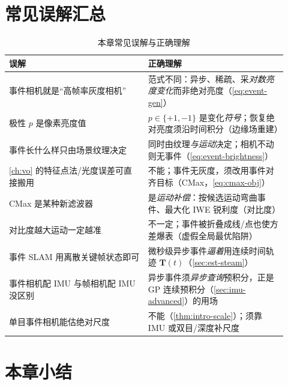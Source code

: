 \section*{常见误解汇总}

\begin{table}[H]\centering\small
\caption{本章常见误解与正确理解}
\begin{tabular}{p{0.46\linewidth}p{0.46\linewidth}}
\toprule
误解 & 正确理解 \\
\midrule
事件相机就是“高帧率灰度相机” & 范式不同：异步、稀疏、采\emph{对数亮度变化}而非绝对亮度（\cref{eq:event-gen}）\\
极性 $p$ 是像素亮度值 & $p\in\{+1,-1\}$ 是变化\emph{符号}；恢复绝对亮度须沿时间积分（边缘场重建）\\
事件长什么样只由场景纹理决定 & 同时由纹理\emph{与运动}决定；相机不动则无事件（\cref{eq:event-brightness}）\\
\cref{ch:vo} 的特征点法/光度误差可直接搬用 & 不能；事件无灰度，须改用事件对齐目标（CMax，\cref{eq:cmax-obj}）\\
CMax 是某种新滤波器 & 是\emph{运动补偿}：按候选运动弯曲事件、最大化 IWE 锐利度（对比度）\\
对比度越大运动一定越准 & 不一定；事件被折叠成线/点也使方差爆表（虚假全局最优陷阱）\\
事件 SLAM 用离散关键帧状态即可 & 微秒级异步事件\emph{逼着}用连续时间轨迹 $\mathbf T(t)$（\cref{sec:est-steam}）\\
事件相机配 IMU 与帧相机配 IMU 没区别 & 异步事件须\emph{异步查询}预积分，正是 GP 连续预积分（\cref{sec:imu-advanced}）的用场 \\
单目事件相机能估绝对尺度 & 不能（\cref{thm:intro-scale}）；须靠 IMU 或双目/深度补尺度 \\
\bottomrule
\end{tabular}
\end{table}

\section*{本章小结}

